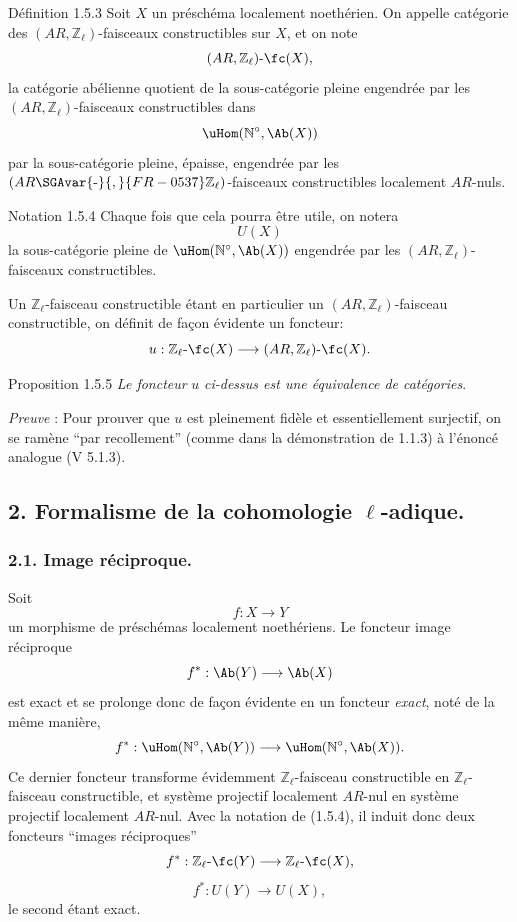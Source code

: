 \begin{statement}{Définition 1.5.3}
Soit \(X\) un préschéma localement noethérien. On appelle catégorie des \((AR,\mathbb{Z}_\ell)\)-faisceaux constructibles sur \(X\), et on note
\[
(AR,\mathbb{Z}_\ell)\text{-}\fc(X),
\]
la
catégorie abélienne quotient de la sous-catégorie pleine engendrée par les \((AR,\mathbb{Z}_\ell)\)-faisceaux constructibles dans
\[
\uHom(\mathbb{N}^\circ,\Ab(X))
\]
par la sous-catégorie pleine, épaisse, engendrée par les \((AR\SGAvar{\text{-}}{,}{FR-0537}\mathbb{Z}_\ell)\)-faisceaux constructibles localement \(AR\)-nuls.
\end{statement}

\begin{statement}{Notation 1.5.4}
Chaque fois que cela pourra être utile, on notera
\[
U(X)
\]
la sous-catégorie pleine de \(\uHom(\mathbb{N}^\circ,\Ab(X))\) engendrée par les \((AR,\mathbb{Z}_\ell)\)-faisceaux constructibles.
\end{statement}

Un \(\mathbb{Z}_\ell\)-faisceau constructible étant en particulier un \((AR,\mathbb{Z}_\ell)\)-faisceau constructible, on définit de façon évidente un foncteur:
\[
u:\mathbb{Z}_\ell\text{-}\fc(X)\longrightarrow (AR,\mathbb{Z}_\ell)\text{-}\fc(X).
\]

\begin{statement}{Proposition 1.5.5}
\emph{Le foncteur} \(u\) \emph{ci-dessus est une équivalence de catégories}.
\end{statement}

\emph{Preuve} : Pour prouver que \(u\) est pleinement fidèle et essentiellement surjectif, on se ramène ``par recollement'' (comme dans la démonstration de 1.1.3) à l'énoncé analogue (V 5.1.3).

\subsection*{2. Formalisme de la cohomologie \(\ell\)-adique.}

\subsubsection*{2.1. Image réciproque.}

Soit
\[
f:X\longrightarrow Y
\]
un morphisme de préschémas localement noethériens. Le foncteur image réciproque
\[
f^*:\Ab(Y)\longrightarrow \Ab(X)
\]
est exact et se prolonge donc de façon évidente en un foncteur \emph{exact}, noté de la même manière,
\[
f^*:\uHom(\mathbb{N}^\circ,\Ab(Y))\longrightarrow \uHom(\mathbb{N}^\circ,\Ab(X)).
\]
Ce dernier foncteur transforme évidemment \(\mathbb{Z}_\ell\)-faisceau constructible en \(\mathbb{Z}_\ell\)-faisceau constructible, et système projectif localement \(AR\)-nul en système projectif localement \(AR\)-nul. Avec la notation de (1.5.4), il induit donc deux foncteurs ``images réciproques''
\[
f^*:\mathbb{Z}_\ell\text{-}\fc(Y)\longrightarrow \mathbb{Z}_\ell\text{-}\fc(X),
\]
\[
f^*:U(Y)\longrightarrow U(X),
\]
le second étant exact.

